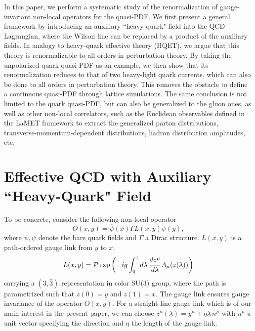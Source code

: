 \documentclass[prd,aps,twocolumn,preprintnumbers, showpacs, nofootinbib,superscriptaddress,notitlepage]{revtex4-1}
\begin{document}
In this paper, we perform a systematic study of the renormalization of gauge-invariant non-local operators for the quasi-PDF. We first present a general framework by introducing an auxiliary ``heavy quark" field into the QCD Lagrangian, where the Wilson line can be replaced by a product of the auxiliary fields. In analogy to heavy-quark effective theory (HQET), we argue that this theory is renormalizable to all orders in perturbation theory. By taking the unpolarized quark quasi-PDF as an example, we then show that its renormalization reduces to that of two heavy-light quark currents, which can also be done to all orders in perturbation theory. This removes
the obstacle to define a continuous quasi-PDF through lattice simulations. The same conclusion is not limited to the quark quasi-PDF, but can also be generalized to the gluon ones, as well as
other non-local correlators, such as the Euclidean observables defined in the LaMET framework to extract the generalized parton distributions,
transverse-momentum-dependent distributions, hadron distribution
amplitudes, etc. 

\section{Effective QCD with Auxiliary ``Heavy-Quark" Field}

To be concrete, consider the following non-local operator
\begin{equation}\label{Eq:nonlocalop}
 O(x,y) = \overline{\psi}(x) \Gamma L(x,y)\psi(y),
\end{equation}
where $\psi, \bar\psi$ denote the bare quark fields and $\Gamma$ a Dirac structure. $L(x, y)$ is a path-ordered gauge link from $y$ to $x$,
\begin{equation}
             L(x, y) = {\cal P}\exp\left(-ig\int^1_0 d\lambda\,\frac{dz^\mu}{d\lambda}  A_\mu(z(\lambda))\right)
\end{equation}
carrying a $(3,\bar 3)$ representation in color SU(3) group, where the path is parametrized such that $z(0)=y$ and $z(1)=x$. The gauge link ensures gauge invariance of the operator $O(x,y)$. 
For a straight-line gauge link which is of our main interest in the present paper, we can choose $z^\mu(\lambda)=y^\mu+\eta\lambda\, n^\mu$ with $n^\mu$ a unit vector specifying the direction and $\eta$ the length of the gauge link.
\end{document}
